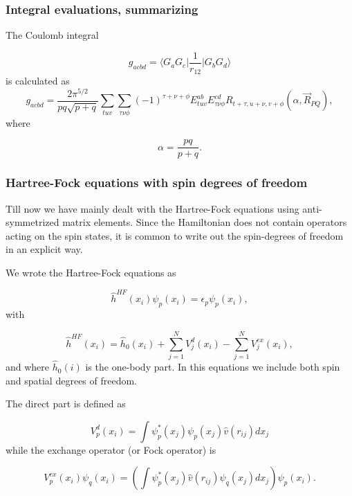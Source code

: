 \documentclass{beamer}
\begin{document}
\begin{frame}
\frametitle{Integral evaluations, summarizing}

\begin{block}{}

The Coulomb integral

\begin{equation}
 g_{acbd} = \langle G_a G_c\vert \frac{1}{r_{12}}\vert G_b G_d\rangle
\end{equation}
is calculated as
\begin{equation}
 g_{acbd} = \frac{2\pi^{5/2}}{pq\sqrt{p+q}}\sum_{tuv}\sum_{\tau\nu\phi}(-1)^{\tau+\nu+\phi}E^{ab}_{tuv}E^{cd}_{\tau\nu\phi}R_{t+\tau,u+\nu,v+\phi}(\alpha,\vec R_{PQ}),
\end{equation}
where

\begin{equation}
  \alpha = \frac{pq}{p + q}.
\end{equation}
\end{block}
\end{frame}

\begin{frame}
\frametitle{Hartree-Fock equations with spin degrees of freedom}

\begin{block}{}

Till now we have mainly dealt with the Hartree-Fock equations using anti-symmetrized matrix elements. Since the Hamiltonian does not 
contain operators acting on the spin states, it is common to write out the spin-degrees of freedom in an explicit way.

We wrote the Hartree-Fock equations as

\begin{equation*}
  \hat{h}^{HF}(x_i) \psi_{p}(x_i) = \epsilon_{p}\psi_{p}(x_i),
\end{equation*}
with

\begin{equation*}
  \hat{h}^{HF}(x_i)= \hat{h}_0(x_i) + \sum_{j=1}^NV_{j}^{d}(x_i) -
  \sum_{j=1}^NV_{j}^{ex}(x_i),
\end{equation*}
and where $\hat{h}_0(i)$ is the one-body part.
In this equations we include both spin and spatial degrees of freedom.

The direct part is defined as

\begin{equation*}
  V_{p}^{d}(x_i) = \int \psi_{p}^*(x_j)\psi_{p}(x_j)\hat{v}(r_{ij}) dx_j
\end{equation*}
while the exchange operator (or Fock operator) is

\begin{equation*}
  V_{p}^{ex}(x_i) \psi_{q}(x_i) 
  = \left(\int \psi_{p}^*(x_j) 
  \hat{v}(r_{ij})\psi_{q}(x_j)
  dx_j\right)\psi_{p}(x_i).
\end{equation*}
\end{block}
\end{frame}
\end{document}
